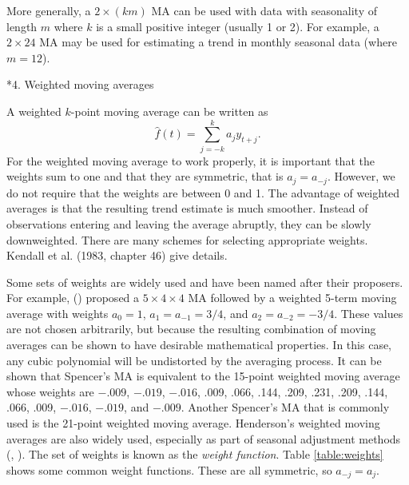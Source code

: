 \documentclass[10pt]{article}
\makeatletter
\renewcommand{\section}%
{\@startsection{section}{1}{0mm}{\baselineskip}{0.5\baselineskip}{\normalfont\large\rmfamily\bfseries}}
\makeatother
\begin{document}
More generally, a $2\times(km)$ MA can be  used with data with seasonality of length $m$ where $k$ is a small positive integer (usually 1 or 2). For example, a $2\times24$ MA may be used for estimating a trend in monthly seasonal data (where $m=12$).


\section*{4. Weighted moving averages}

A weighted $k$-point moving average can be written as
\[
\hat{f}(t) = \sum^{k}_{j=-k} a_jy_{t+j}.
\]
For the weighted moving average to work properly, it is important that the weights sum to one and that they are symmetric, that is $a_j = a_{-j}$. However, we do not require that the weights are between 0 and 1. The advantage of weighted averages is that the resulting trend estimate is much smoother.  Instead of observations entering and leaving the average abruptly, they can be slowly downweighted. There are many schemes for selecting appropriate weights.  Kendall et al. (1983, chapter 46) give details.


Some sets of weights are widely used and have been named after their proposers. 
 For example, \citeauthor{Spencer04} (\citeyear{Spencer04}) 
proposed a $5\times4\times4$ MA followed by a weighted 5-term moving
 average with weights $a_0=1$, $a_1=a_{-1}=3/4$, and $a_2=a_{-2}=-3/4$.  These values are not chosen arbitrarily, but because the resulting combination of moving averages can be shown to have desirable mathematical properties. In this case, any cubic polynomial will be undistorted by the averaging process. It can be shown that Spencer's MA is equivalent to the 15-point weighted moving average whose weights are $-.009$, $-.019$, $-.016$, .009, .066, .144, .209, .231, .209, .144, .066, .009, $-.016$, $-.019$, and $-.009$.  Another Spencer's MA that is commonly used is the 21-point  weighted moving average. Henderson's weighted moving averages are also widely used, especially as
 part of seasonal adjustment methods (\citeauthor{LQ01}, \citeyear{LQ01}).  The set of weights is known as the \emph{weight function}. Table \ref{table:weights} shows some common weight functions. These are all symmetric, so $a_{-j} = a_j$.
\end{document}
